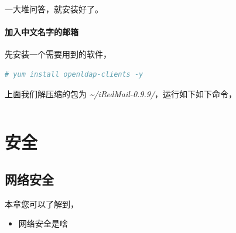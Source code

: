 \documentclass[doctor,openright,twoside]{sjtuthesis}
\newif\ifusepartquote
\newcommand{\thepartquote}{}
\newcommand{\thepartquoteauthor}{}
\newcommand{\partquote}[2]{\ifusepartquote\renewcommand{\thepartquote}{#1}\renewcommand{\thepartquoteauthor}{#2}\fi}
\newif\ifusepartintro
\newcommand{\thepartintro}{}
\newcommand{\partintro}[1]{\ifusepartintro\renewcommand{\thepartintro}{#1}\fi}
\providecommand{\tightlist}{%
    \setlength{\itemsep}{0pt}\setlength{\parskip}{0pt}}
\theoremstyle{plain}
\theoremstyle{definition}
\theoremstyle{remark}
\theoremstyle{ocrenumbox}
\theoremstyle{plain}
\begin{document}
一大堆问答，就安装好了。

\hypertarget{section-140}{%
\subsection{加入中文名字的邮箱}\label{section-140}}

先安装一个需要用到的软件，

\begin{lstlisting}[language=bash]
# yum install openldap-clients -y
\end{lstlisting}

上面我们解压缩的包为 \emph{\textasciitilde/iRedMail-0.9.9/}，运行如下如下命令，

\begin{lstlisting}[language=bash]
\end{lstlisting}

\partquote{三军之事，莫亲于间，赏莫厚于间，事莫密于间。非圣智不能用间，非仁义不能使间，非微妙不能得间之实。微哉！微哉！无所不用间也。}{孙武《孙子兵法 用间》}
\partintro{
古人云“千里之堤，溃于蚁穴”。害人之心不可有，防人之心不可无。作为系统使用者和管理者，必须牢牢绷紧安全这根弦。本部分简要的介绍一些安全常识，也只是避免一些小的安全隐患。更多知识，还需查阅更专业的安全书籍和资料。
}

\hypertarget{part:security}{%
\part{安全}\label{part:security}}

\hypertarget{chap:network-security}{%
\chapter{网络安全}\label{chap:network-security}}

本章您可以了解到，

\begin{itemize}
\tightlist
\item
  网络安全是啥
\end{itemize}

\partquote{这只是万里长征走完了第一步，以后的路程更长，工作更伟大，更艰苦。务必使同志们继续地保持谦虚、谨慎、不骄不躁的作风，务必使同志们继续地保持艰苦奋斗的作风。}{毛泽东}
\partintro{
\quad\quad 附录，首先引用了中国的一篇古文《愚公移山》，目的是告诉自己要坚持坚持再坚持；其次讲述了本书的制作步骤，方便后来人对模板进行改编和再创作；再次介绍了本书的大致框架设计，提醒需要注意的问题；再次列举了写作中常见的 \LaTeX 和 Bookdown 编写的示例；最后是常见问题解答以及本书的大事记。
}
\end{document}
